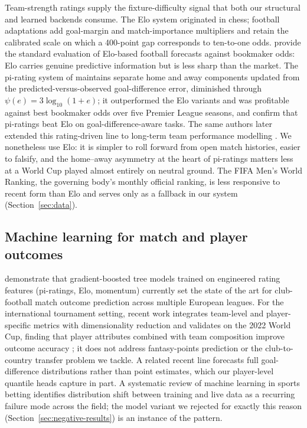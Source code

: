 Team-strength ratings supply the fixture-difficulty signal that both
our structural and learned backends consume. The Elo system
\citep{elo1978rating} originated in chess; football adaptations add
goal-margin and match-importance multipliers and retain the
calibrated scale on which a 400-point gap corresponds to ten-to-one
odds. \citet{hvattum2010using} provide the standard evaluation of
Elo-based football forecasts against bookmaker odds: Elo carries
genuine predictive information but is less sharp than the market.
The pi-rating system of \citet{constantinou2013pi} maintains separate
home and away components updated from the predicted-versus-observed
goal-difference error, diminished through
$\psi(e) = 3\log_{10}(1+e)$; it outperformed the
\citet{hvattum2010using} Elo variants and was profitable against best
bookmaker odds over five Premier League seasons, and
\citet{bunker2024soccer} confirm that pi-ratings beat Elo on
goal-difference-aware tasks. The same authors later extended this
rating-driven line to long-term team performance modelling
\citep{constantinou2017towards}. We nonetheless use Elo: it is
simpler to roll forward from open match histories, easier to falsify,
and the home--away asymmetry at the heart of pi-ratings matters less
at a World Cup played almost entirely on neutral ground. The FIFA
Men's World Ranking, the governing body's monthly official ranking,
is less responsive to recent form than Elo and serves only as a
fallback in our system (Section~\ref{sec:data}).

\subsection{Machine learning for match and player outcomes}
\label{sec:related-ml}

\citet{bunker2024soccer} demonstrate that gradient-boosted tree
models trained on engineered rating features (pi-ratings, Elo,
momentum) currently set the state of the art for club-football match
outcome prediction across multiple European leagues. For the
international tournament setting, recent work integrates team-level
and player-specific metrics with dimensionality reduction and
validates on the 2022 World Cup, finding that player attributes
combined with team composition improve outcome accuracy
\citep{worldcup2025players}; it does not address fantasy-points
prediction or the club-to-country transfer problem we tackle. A related recent line forecasts full
goal-difference distributions rather than point estimates,
which our player-level quantile heads capture in part. A systematic
review of machine learning in sports betting
\citep{sportsbetting2024review} identifies distribution shift between
training and live data as a recurring failure mode across the field;
the model variant we rejected for exactly this reason
(Section~\ref{sec:negative-results}) is an instance of the pattern.

